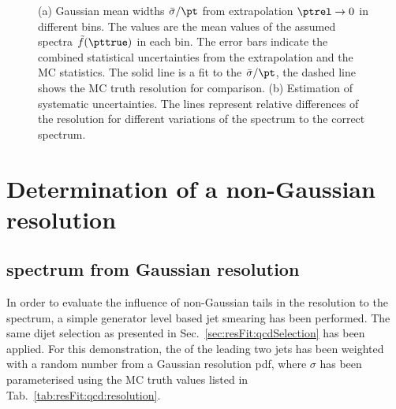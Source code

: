 \documentclass[a4paper]{cmspaper} %
\begin{document}
\begin{figure}[ht]
  \begin{center}
     
  \end{center}
  \caption{(a) Gaussian mean widths $\bar{\sigma}/\pt$ from extrapolation \mbox{$\ptrel\rightarrow0$} in different \pt bins.
  The \pt values are the mean values of the assumed spectra $\tilde{f}(\pttrue)$ in each bin.
  The error bars indicate the combined statistical uncertainties from the extrapolation and the MC statistics.
  The solid line is a fit to the $\bar{\sigma}/\pt$, the dashed line shows the MC truth resolution for comparison.
  (b) Estimation of systematic uncertainties.
  The lines represent relative differences of the resolution for different variations of the spectrum to the correct spectrum.}
\end{figure}
\clearpage


\section{Determination of a non-Gaussian resolution}

\subsection{\mht spectrum from Gaussian resolution}
In order to evaluate the influence of non-Gaussian tails in the resolution to the \mht spectrum, a simple generator level based jet smearing has been performed.
The same dijet selection as presented in Sec.~\ref{sec:resFit:qcdSelection} has been applied.
For this demonstration, the \ptpart of the leading two jets has been weighted with a random number from a Gaussian resolution pdf, where $\sigma$ has been parameterised using the MC truth values listed in Tab.~\ref{tab:resFit:qcd:resolution}.
\end{document}
